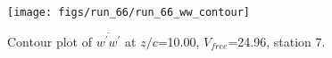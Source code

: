 \begin{figure}[H]
\centering
\texttt{[image: figs/run\_66/run\_66\_ww\_contour]}
\caption{Contour plot of $\overline{w^\prime w^\prime}$ at $z/c$=10.00, $V_{free}$=24.96, station 7.}
\end{figure}


